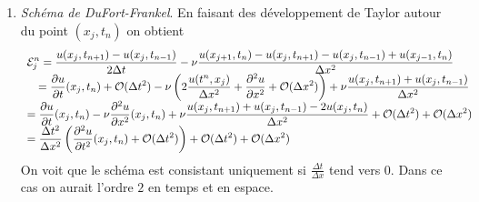 \documentclass[12pt,a4paper]{article}
\begin{document}
\begin{enumerate}
\item {\it Sch\'ema de DuFort-Frankel}. En faisant des d\'eveloppement
  de Taylor autour du point $(x_j,t_{n})$ on obtient
$$
\begin{array}{l}
\displaystyle{\cal E}^n_j=\frac{u(x_j,t_{n+1})-u(x_j,t_{n-1})}{2\Delta
  t}-\nu \frac{u(x_{j+1},t_{n})-u(x_j,t_{n+1})-u(x_j,t_{n-1})+u(x_{j-1},t_{n})}{\Delta
  x^2} \\
\quad = \displaystyle \frac{\partial
  u}{\partial t} (x_j,t_{n}) + {\cal O}(\Delta t^2) - \nu \left(2\frac{u(t^n,x_j)}{\Delta x^2}+ \frac{\partial ^2u}{\partial x^2} + {\cal O}(\Delta x^2) \right)
 + \nu \frac{u(x_j,t_{n+1})+u(x_j,t_{n-1})}{\Delta
  x^2} \\
   = \displaystyle \frac{\partial
  u}{\partial t} (x_j,t_{n}) -\nu \frac{\partial ^2u}{\partial x^2} (x_j,t_{n}) 
 + \nu \frac{u(x_j,t_{n+1})+u(x_j,t_{n-1})-2u(x_j,t_n)}{\Delta
  x^2} + {\cal O}(\Delta t^2)+{\cal O}(\Delta x^2)\\
   =\displaystyle \frac{\Delta t^2}{\Delta x^2} \left( \frac{\partial^2 u}{\partial t^2}(x_j,t_n) +{\cal O}(\Delta t^2) \right)+ {\cal O}(\Delta t^2)+{\cal O}(\Delta x^2)
  
\end{array}
$$
On voit que le sch\'ema est consistant uniquement si $\frac{\Delta
  t}{\Delta x}$ tend vers $0$.  Dans ce cas on aurait l'ordre $2$ en temps et en espace.

\end{enumerate}
\end{document}
